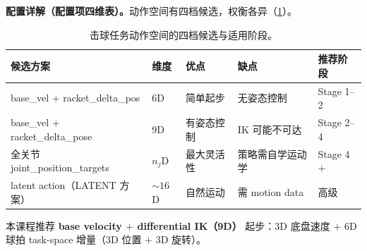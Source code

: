 \textbf{配置详解（配置项四维表）。}动作空间有四档候选，权衡各异（\cref{tab:rlmc-strike-actionspace}）。

\begin{table}[H]
\centering
\small
\caption{击球任务动作空间的四档候选与适用阶段。}
\label{tab:rlmc-strike-actionspace}
\begin{tabular}{@{}lllll@{}}
\toprule
候选方案 & 维度 & 优点 & 缺点 & 推荐阶段 \\
\midrule
base\_vel $+$ racket\_delta\_pos & 6D & 简单起步 & 无姿态控制 & Stage 1--2 \\
base\_vel $+$ racket\_delta\_pose & 9D & 有姿态控制 & IK 可能不可达 & Stage 2--4 \\
全关节 joint\_position\_targets & $n_j$D & 最大灵活性 & 策略需自学运动学 & Stage 4$+$ \\
latent action（LATENT 方案） & $\sim 16$D & 自然运动 & 需 motion data & 高级 \\
\bottomrule
\end{tabular}
\end{table}

本课程推荐 \textbf{base velocity $+$ differential IK（9D）} 起步：3D 底盘速度 $+$ 6D 球拍 task-space 增量（3D 位置 $+$ 3D 旋转）。

